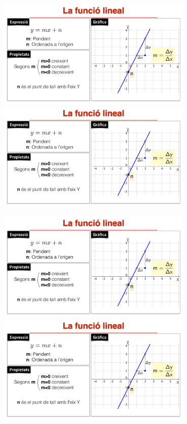 \begin{center}
\includegraphics[width=0.7\textwidth,angle=90,origin=c,page=7]{img-05/funcions-elementals}
\hspace{1cm}
\includegraphics[width=0.7\textwidth,angle=90,origin=c,page=8]{img-05/funcions-elementals}

\includegraphics[width=0.7\textwidth,angle=90,origin=c,page=5]{img-05/funcions-elementals}
\hspace{1cm}
\includegraphics[width=0.7\textwidth,angle=90,origin=c,page=6]{img-05/funcions-elementals}
\end{center}
 
